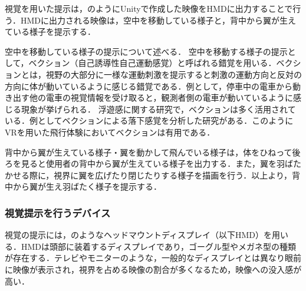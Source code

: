         視覚を用いた提示は，のようにUnityで作成した映像をHMDに出力することで行う．HMDに出力される映像は，空中を移動している様子と，背中から翼が生えている様子を提示する．

        空中を移動している様子の提示について述べる．
        空中を移動する様子の提示として，ベクション（自己誘導性自己運動感覚）と呼ばれる錯覚を用いる．ベクションとは，視野の大部分に一様な運動刺激を提示すると刺激の運動方向と反対の方向に体が動いているように感じる錯覚である\cite{妹尾武治2014ベクションとその周辺の近年の動向}．例として，停車中の電車から動き出す他の電車の視覚情報を受け取ると，観測者側の電車が動いているように感じる現象が挙げられる．
        浮遊感に関する研究で，ベクションは多く活用されている．例としてベクションによる落下感覚を分析した研究がある\cite{奥川夏輝2017VR空間における視覚刺激によって発生する落下感覚の分析}．このようにVRを用いた飛行体験においてベクションは有用である．

        背中から翼が生えている様子・翼を動かして飛んでいる様子は，体をひねって後ろを見ると使用者の背中から翼が生えている様子を出力する．また，翼を羽ばたかせる際に，視界に翼を広げたり閉じたりする様子を描画を行う．以上より，背中から翼が生え羽ばたく様子を提示する．

        \subsubsection{視覚提示を行うデバイス}

            視覚の提示には，のようなヘッドマウントディスプレイ（以下HMD）を用いる．HMDは頭部に装着するディスプレイであり，ゴーグル型やメガネ型の種類が存在する．テレビやモニターのような，一般的なディスプレイとは異なり眼前に映像が表示され，視界を占める映像の割合が多くなるため，映像への没入感が高い．

